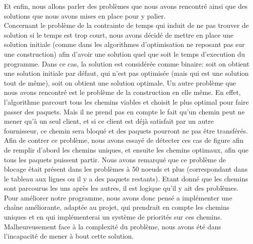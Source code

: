 \documentclass[a4paper,10pt]{article}
\begin{document}
\hspace{0.5cm}Et enfin, nous allons parler des problèmes que nous avons rencontré ainsi que des
solutions que nous avons mises en place pour y palier. \\ Concernant le problème de la contrainte de 
temps qui induit de ne pas trouver de solution si le temps est trop court, nous avons décidé de 
mettre en place une solution initiale (comme dans les algorithmes d'optimisation ne reposant pas sur 
une construction) afin d'avoir une solution quel que soit le temps d'execution du programme. Dans 
ce cas, la solution est considérée comme binaire: soit on obtient une solution initiale par défaut, qui n'est pas 
optimisée (mais qui est une solution tout de même), soit on obtient une solution optimale. 
Un autre problème que nous avons rencontré est le problème de la construction en elle même.
En effet, l'algorithme parcourt tous les chemins viables et choisit le plus optimal pour faire
passer des paquets. Mais il ne prend pas en compte le fait qu'un chemin peut ne mener qu'à un seul 
client, et si ce client est déjà satisfait par un autre fournisseur, ce chemin sera bloqué et 
des paquets pourront ne pas être transférés. \\Afin de contrer ce problème, nous avons essayé de 
détecter ces cas de figure afin de remplir d'abord les chemins uniques, et ensuite les chemins 
optimaux, afin que tous les paquets puissent partir. Nous avons remarqué que ce problème de blocage
était présent dans les problèmes à 50 noeuds et plus (correspondant dans le tableau aux lignes ou il
y a des paquets restants). Etant donné que les chemins sont parcourus 
les uns après les autres, il est logique qu'il y ait des problèmes. Pour améliorer notre programme,
nous avons donc pensé a implémenter une chaîne améliorante, adaptée au projet, qui prendrait en compte les chemins uniques et 
en qui implémenterai un système de priorités sur ces chemins. Malheureusement face à la complexité du 
problème, nous avons été dans l'incapacité de mener à bout cette solution.
\end{document}
